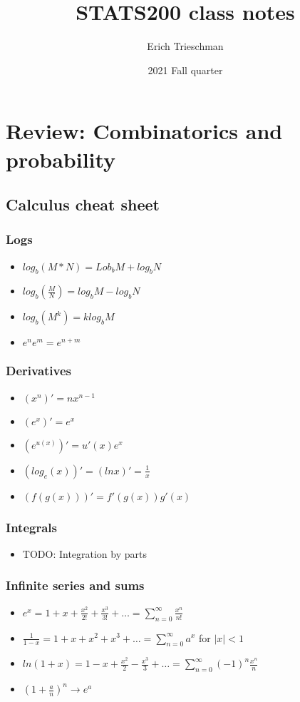 \documentclass{article}
\title{STATS200 class notes}
\author{Erich Trieschman}
\date{2021 Fall quarter}
\newcommand{\abs}[1]{\lvert#1\rvert}
\begin{document}
\maketitle

\section{Review: Combinatorics and probability}
\subsection{Calculus cheat sheet}
\subsubsection{Logs}
\begin{itemize}
	\item $log_b(M * N) = Lob_bM + log_bN$
	\item $log_b(\frac{M}{N}) = log_bM - log_bN$
	\item $log_b(M^k) = klog_bM$
	\item $e^ne^m = e^{n+m}$
\end{itemize}
\subsubsection{Derivatives}
\begin{itemize}
	\item $(x^n)' = nx^{n-1}$
	\item $(e^x)' = e^x$
	\item $(e^{u(x)})' = u'(x)e^x$
	\item $(log_e(x))' = (lnx)' = \frac{1}{x}$
	\item $(f(g(x)))' = f'(g(x))g'(x)$
\end{itemize}
\subsubsection{Integrals}
\begin{itemize}
	\item TODO: Integration by parts
\end{itemize}
\subsubsection{Infinite series and sums}
\begin{itemize}
	\item $e^x = 1 + x + \frac{x^2}{2!} + \frac{x^3}{3!} + \dots = \sum_{n=0}^\infty \frac{x^n}{n!}$
	\item $\frac{1}{1-x} = 1 + x + x^2 + x^3 + \dots = \sum_{n=0}^\infty a^x$ for $\abs{x} < 1$
	\item $ln(1 + x) = 1 - x + \frac{x^2}{2} - \frac{x^3}{3} + \dots = \sum_{n=0}^\infty (-1)^n\frac{x^n}{n}$
	\item $(1 + \frac{a}{n})^n \longrightarrow e^a$
\end{itemize}
\end{document}
